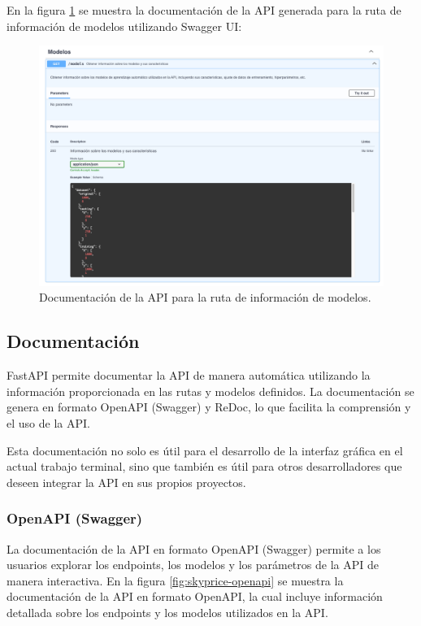 En la figura \ref{fig:api-modelos} se muestra la documentación de la API generada
para la ruta de información de modelos utilizando Swagger UI:

\begin{figure}[H]
    \centering
    \includegraphics[width=1.0\textwidth]{imagenes/05-implementacion/servicio-web/api-models.png}
    \caption{Documentación de la API para la ruta de información de modelos.}
    \label{fig:api-modelos}
\end{figure}

\subsection{Documentación}
FastAPI permite documentar la API de manera automática utilizando la información
proporcionada en las rutas y modelos definidos. La documentación se genera en
formato OpenAPI (Swagger) y ReDoc, lo que facilita la comprensión y el uso de la API.

Esta documentación no solo es útil para el desarrollo de la interfaz gráfica en
el actual trabajo terminal, sino que también es útil para otros desarrolladores
que deseen integrar la API en sus propios proyectos.

\subsubsection{OpenAPI (Swagger)}
La documentación de la API en formato OpenAPI (Swagger) permite a los usuarios
explorar los endpoints, los modelos y los parámetros de la API de manera interactiva.
En la figura \ref{fig:skyprice-openapi} se muestra la documentación de la API en
formato OpenAPI, la cual incluye información detallada sobre los endpoints y los
modelos utilizados en la API.

